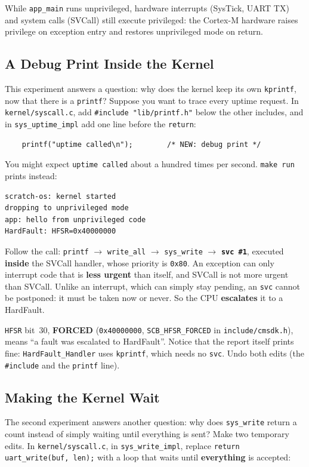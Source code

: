 While \texttt{app\_main} runs unprivileged, hardware interrupts (SysTick, UART TX) and system calls (SVCall) still execute privileged: the Cortex-M hardware raises privilege on exception entry and restores unprivileged mode on return.

\subsection{A Debug Print Inside the Kernel}
This experiment answers a question: why does the kernel keep its own \texttt{kprintf}, now that there is a \texttt{printf}? Suppose you want to trace every uptime request. In \texttt{kernel/syscall.c}, add \texttt{\#include "lib/printf.h"} below the other includes, and in \texttt{sys\_uptime\_impl} add one line before the \texttt{return}:

\begin{lstlisting}
    printf("uptime called\n");        /* NEW: debug print */
\end{lstlisting}

You might expect \texttt{uptime called} about a hundred times per second. \texttt{make run} prints instead:

\begin{lstlisting}[language=bash]
scratch-os: kernel started
dropping to unprivileged mode
app: hello from unprivileged code
HardFault: HFSR=0x40000000
\end{lstlisting}

Follow the call: \texttt{printf} $\rightarrow$ \texttt{write\_all} $\rightarrow$ \texttt{sys\_write} $\rightarrow$ \textbf{\texttt{svc \#1}}, executed \textbf{inside} the SVCall handler, whose priority is \texttt{0x80}. An exception can only interrupt code that is \textbf{less urgent} than itself, and SVCall is not more urgent than SVCall. Unlike an interrupt, which can simply stay pending, an \texttt{svc} cannot be postponed: it must be taken now or never. So the CPU \textbf{escalates} it to a HardFault.

\texttt{HFSR} bit~30, \textbf{FORCED} (\texttt{0x40000000}, \texttt{SCB\_HFSR\_FORCED} in \texttt{include/cmsdk.h}), means ``a fault was escalated to HardFault''. Notice that the report itself prints fine: \texttt{HardFault\_Handler} uses \texttt{kprintf}, which needs no \texttt{svc}. Undo both edits (the \texttt{\#include} and the \texttt{printf} line).

\subsection{Making the Kernel Wait}
The second experiment answers another question: why does \texttt{sys\_write} return a count instead of simply waiting until everything is sent? Make two temporary edits. In \texttt{kernel/syscall.c}, in \texttt{sys\_write\_impl}, replace \texttt{return uart\_write(buf, len);} with a loop that waits until \textbf{everything} is accepted:

